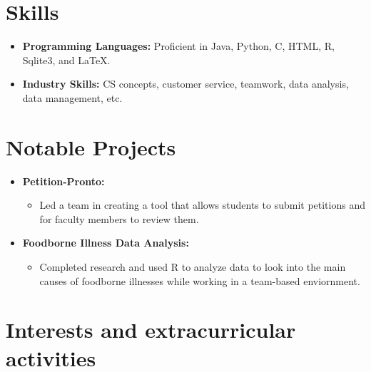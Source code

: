 \documentclass[11pt,a4paper,sans]{moderncv}
\begin{document}
\section{Skills}

\vspace{2pt}

\begin{itemize} %
\item \textbf{Programming Languages:} Proficient in Java, Python, C, HTML, R, Sqlite3, and LaTeX.
\vspace{2pt}
\item \textbf{Industry Skills:} CS concepts, customer service, teamwork, data analysis, data management, etc.
\end{itemize} %


\section{Notable Projects}

\vspace{2pt}

\begin{itemize} %
\item \textbf{Petition-Pronto:}
\begin{itemize} %
  \item Led a team in creating a tool that allows students to submit petitions and for faculty members to review them.
\end{itemize} %
\vspace{2pt}
\item \textbf{Foodborne Illness Data Analysis:}
\begin{itemize} %
  \item Completed research and used R to analyze data to look into the main causes of foodborne illnesses while working in a team-based enviornment.
\end{itemize} %
\end{itemize} %


\section{Interests and extracurricular activities}
\vspace{2pt}
\end{document}
